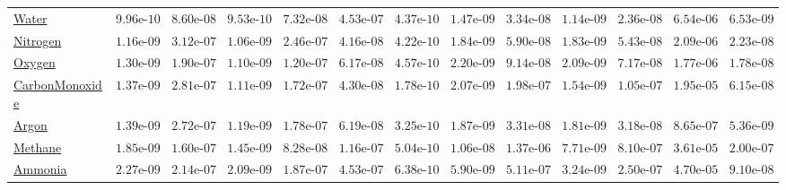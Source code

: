 \documentclass[10pt,a4paper]{article}
\begin{document}
\begin{table}[ht!]
{\begin{tabular}{lrrrrrrrrrrrr}
\href{https://github.com/satwikgupta122/realgas_ml/blob/main/realgas_ml/data/Water_metrics.json}{Water} & $9.96\text{e-}10$ & $8.60\text{e-}08$ & $9.53\text{e-}10$ & $7.32\text{e-}08$ & $4.53\text{e-}07$ & $4.37\text{e-}10$ & $1.47\text{e-}09$ & $3.34\text{e-}08$ & $1.14\text{e-}09$ & $2.36\text{e-}08$ & $6.54\text{e-}06$ & $6.53\text{e-}09$ \\
\href{https://github.com/satwikgupta122/realgas_ml/blob/main/realgas_ml/data/Nitrogen_metrics.json}{Nitrogen} & $1.16\text{e-}09$ & $3.12\text{e-}07$ & $1.06\text{e-}09$ & $2.46\text{e-}07$ & $4.16\text{e-}08$ & $4.22\text{e-}10$ & $1.84\text{e-}09$ & $5.90\text{e-}08$ & $1.83\text{e-}09$ & $5.43\text{e-}08$ & $2.09\text{e-}06$ & $2.23\text{e-}08$ \\
\href{https://github.com/satwikgupta122/realgas_ml/blob/main/realgas_ml/data/Oxygen_metrics.json}{Oxygen} & $1.30\text{e-}09$ & $1.90\text{e-}07$ & $1.10\text{e-}09$ & $1.20\text{e-}07$ & $6.17\text{e-}08$ & $4.57\text{e-}10$ & $2.20\text{e-}09$ & $9.14\text{e-}08$ & $2.09\text{e-}09$ & $7.17\text{e-}08$ & $1.77\text{e-}06$ & $1.78\text{e-}08$ \\
\href{https://github.com/satwikgupta122/realgas_ml/blob/main/realgas_ml/data/CarbonMonoxide_metrics.json}{CarbonMonoxide} & $1.37\text{e-}09$ & $2.81\text{e-}07$ & $1.11\text{e-}09$ & $1.72\text{e-}07$ & $4.30\text{e-}08$ & $1.78\text{e-}10$ & $2.07\text{e-}09$ & $1.98\text{e-}07$ & $1.54\text{e-}09$ & $1.05\text{e-}07$ & $1.95\text{e-}05$ & $6.15\text{e-}08$ \\
\href{https://github.com/satwikgupta122/realgas_ml/blob/main/realgas_ml/data/Argon_metrics.json}{Argon} & $1.39\text{e-}09$ & $2.72\text{e-}07$ & $1.19\text{e-}09$ & $1.78\text{e-}07$ & $6.19\text{e-}08$ & $3.25\text{e-}10$ & $1.87\text{e-}09$ & $3.31\text{e-}08$ & $1.81\text{e-}09$ & $3.18\text{e-}08$ & $8.65\text{e-}07$ & $5.36\text{e-}09$ \\
\href{https://github.com/satwikgupta122/realgas_ml/blob/main/realgas_ml/data/Methane_metrics.json}{Methane} & $1.85\text{e-}09$ & $1.60\text{e-}07$ & $1.45\text{e-}09$ & $8.28\text{e-}08$ & $1.16\text{e-}07$ & $5.04\text{e-}10$ & $1.06\text{e-}08$ & $1.37\text{e-}06$ & $7.71\text{e-}09$ & $8.10\text{e-}07$ & $3.61\text{e-}05$ & $2.00\text{e-}07$ \\
\href{https://github.com/satwikgupta122/realgas_ml/blob/main/realgas_ml/data/Ammonia_metrics.json}{Ammonia} & $2.27\text{e-}09$ & $2.14\text{e-}07$ & $2.09\text{e-}09$ & $1.87\text{e-}07$ & $4.53\text{e-}07$ & $6.38\text{e-}10$ & $5.90\text{e-}09$ & $5.11\text{e-}07$ & $3.24\text{e-}09$ & $2.50\text{e-}07$ & $4.70\text{e-}05$ & $9.10\text{e-}08$ \\

\end{tabular}}
\end{table}
\end{document}
